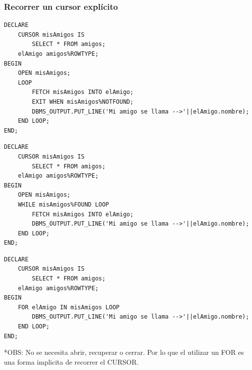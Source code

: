 \documentclass{templateNote}
\begin{document}
\subsubsection{Recorrer un cursor explícito}
\begin{tcolorbox}[
    colframe=Morado!100, %
    colback=Morado!20,       %
    coltitle=white!100, %
    title=\textbf{PL/SQL}: \textit{Recorrer cursor con DO-WHILE.}, %
]
    \begin{verbatim}
DECLARE
    CURSOR misAmigos IS
        SELECT * FROM amigos;
    elAmigo amigos%ROWTYPE;
BEGIN
    OPEN misAmigos;
    LOOP
        FETCH misAmigos INTO elAmigo;
        EXIT WHEN misAmigos%NOTFOUND;
        DBMS_OUTPUT.PUT_LINE('Mi amigo se llama -->'||elAmigo.nombre);
    END LOOP;
END;
    \end{verbatim}
\end{tcolorbox}

\begin{tcolorbox}[
    colframe=Morado!100, %
    colback=Morado!20,       %
    coltitle=white!100, %
    title=\textbf{PL/SQL}: \textit{Recorrer cursor con WHILE.}, %
]
    \begin{verbatim}
DECLARE
    CURSOR misAmigos IS
        SELECT * FROM amigos;
    elAmigo amigos%ROWTYPE;
BEGIN
    OPEN misAmigos;
    WHILE misAmigos%FOUND LOOP
        FETCH misAmigos INTO elAmigo;
        DBMS_OUTPUT.PUT_LINE('Mi amigo se llama -->'||elAmigo.nombre);
    END LOOP;
END;
    \end{verbatim}
\end{tcolorbox}

\begin{tcolorbox}[
    colframe=Verde!100, %
    colback=Verde!20,       %
    coltitle=black!100, %
    title=\textbf{PL/SQL}: \textit{Recorrer cursor con FOR.}, %
]
    \begin{verbatim}
DECLARE
    CURSOR misAmigos IS
        SELECT * FROM amigos;
    elAmigo amigos%ROWTYPE;
BEGIN
    FOR elAmigo IN misAmigos LOOP
        DBMS_OUTPUT.PUT_LINE('Mi amigo se llama -->'||elAmigo.nombre);
    END LOOP;
END;
    \end{verbatim}
\end{tcolorbox}
*OBS: No se necesita abrir, recuperar o cerrar. Por lo que el utilizar un FOR es una forma implicita de recorrer el CURSOR.

\newpage
\end{document}
